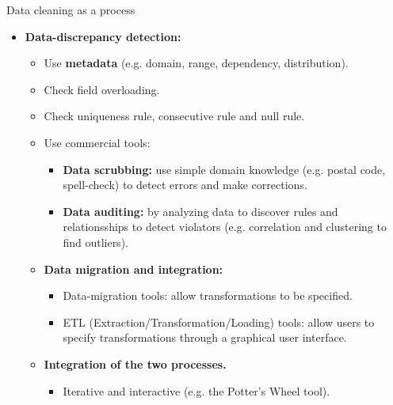 \documentclass[aspectratio=169,t]{beamer}
\begin{document}
 { 
    \begin{frame}{Data cleaning as a process}
    \begin{itemize}
      \item \textbf{Data-discrepancy detection:}
      \begin{itemize}
        \item Use \textbf{\color{airforceblue}metadata} (e.g. domain, range, dependency, distribution).
        \item Check field overloading.
        \item Check uniqueness rule, consecutive rule and null rule.
        \item Use commercial tools:
        \begin{itemize}
          \item \textbf{\color{airforceblue}Data scrubbing:} use simple domain knowledge (e.g. postal code, spell-check) to detect errors and make corrections.
          \item \textbf{\color{airforceblue}Data auditing:} by analyzing data to discover rules and relationsships to detect violators (e.g. correlation and clustering to find outliers).
        \end{itemize}
        \item \textbf{Data migration and integration:}
        \begin{itemize}
          \item Data-migration tools: allow transformations to be specified.
          \item ETL (Extraction/Transformation/Loading) tools: allow users to specify transformations through a graphical user interface.
        \end{itemize}
        \item \textbf{Integration of the two processes.}
        \begin{itemize}
          \item Iterative and interactive (e.g. the Potter's Wheel tool).
        \end{itemize}
      \end{itemize}
    \end{itemize}
    \end{frame}
  }
\end{document}

